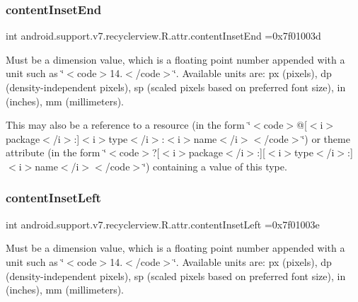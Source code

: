 \subsubsection{\texorpdfstring{content\+Inset\+End}{contentInsetEnd}}
{\footnotesize\ttfamily int android.\+support.\+v7.\+recyclerview.\+R.\+attr.\+content\+Inset\+End =0x7f01003d\hspace{0.3cm}{\ttfamily [static]}}

Must be a dimension value, which is a floating point number appended with a unit such as \char`\"{}$<$code$>$14.\+5sp$<$/code$>$\char`\"{}. Available units are\+: px (pixels), dp (density-\/independent pixels), sp (scaled pixels based on preferred font size), in (inches), mm (millimeters). 

This may also be a reference to a resource (in the form \char`\"{}$<$code$>$@\mbox{[}$<$i$>$package$<$/i$>$\+:\mbox{]}$<$i$>$type$<$/i$>$\+:$<$i$>$name$<$/i$>$$<$/code$>$\char`\"{}) or theme attribute (in the form \char`\"{}$<$code$>$?\mbox{[}$<$i$>$package$<$/i$>$\+:\mbox{]}\mbox{[}$<$i$>$type$<$/i$>$\+:\mbox{]}$<$i$>$name$<$/i$>$$<$/code$>$\char`\"{}) containing a value of this type. \mbox{\label{classandroid_1_1support_1_1v7_1_1recyclerview_1_1R_1_1attr_a6f74b21e606ee8a2ac8e9a504ca6eff0}} 
\subsubsection{\texorpdfstring{content\+Inset\+Left}{contentInsetLeft}}
{\footnotesize\ttfamily int android.\+support.\+v7.\+recyclerview.\+R.\+attr.\+content\+Inset\+Left =0x7f01003e\hspace{0.3cm}{\ttfamily [static]}}

Must be a dimension value, which is a floating point number appended with a unit such as \char`\"{}$<$code$>$14.\+5sp$<$/code$>$\char`\"{}. Available units are\+: px (pixels), dp (density-\/independent pixels), sp (scaled pixels based on preferred font size), in (inches), mm (millimeters). 

